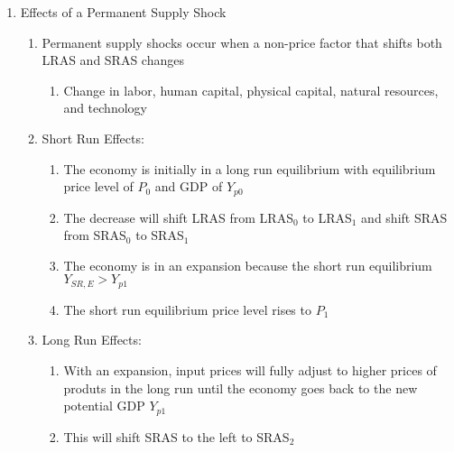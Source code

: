 \documentclass[12pt]{article}
\begin{document}
\begin{enumerate}
\begin{enumerate}
        \end{enumerate}

      \item Effects of a Permanent Supply Shock

        \begin{enumerate}

          \item Permanent supply shocks occur when a non-price factor that shifts both LRAS and SRAS changes

            \begin{enumerate}

              \item Change in labor, human capital, physical capital, natural resources, and technology

            \end{enumerate}
            
          \item Short Run Effects:

            \begin{enumerate}

              \item The economy is initially in a long run equilibrium with equilibrium price level of $P_0$ and GDP of $Y_{p0}$

              \item The decrease will shift LRAS from LRAS$_0$ to LRAS$_1$ and shift SRAS from SRAS$_0$ to SRAS$_1$

              \item The economy is in an expansion because the short run equilibrium $Y_{SR,E}>Y_{p1}$

              \item The short run equilibrium price level rises to $P_1$

            \end{enumerate}

          \item Long Run Effects:

            \begin{enumerate}

              \item With an expansion, input prices will fully adjust to higher prices of produts in the long run until the economy goes back to the new potential GDP $Y_{p1}$

              \item This will shift SRAS to the left to SRAS$_2$


\end{enumerate}
\end{enumerate}
\end{enumerate}
\end{document}
